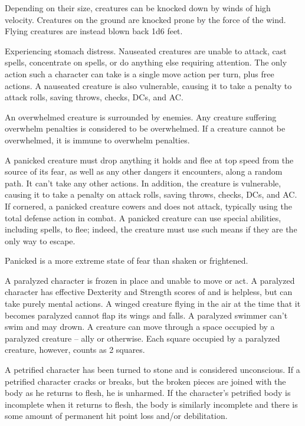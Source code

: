  Depending on their size, creatures can be knocked down by winds of high velocity. Creatures on the ground are knocked prone by the force of the wind. Flying creatures are instead blown back 1d6  feet.

 Experiencing stomach distress. Nauseated creatures are unable to attack, cast spells, concentrate on spells, or do anything else requiring attention. The only action such a character can take is a single move action per turn, plus free actions. A nauseated creature is also vulnerable, causing it to take a  penalty to attack rolls, saving throws, checks, DCs, and AC.

 An overwhelmed creature is surrounded by enemies. Any creature suffering overwhelm penalties is considered to be overwhelmed. If a creature cannot be overwhelmed, it is immune to overwhelm penalties.

 A panicked creature must drop anything it holds and flee at top speed from the source of its fear, as well as any other dangers it encounters, along a random path. It can't take any other actions. In addition, the creature is vulnerable, causing it to take a  penalty on attack rolls, saving throws, checks, DCs, and AC. If cornered, a panicked creature cowers and does not attack, typically using the total defense action in combat. A panicked creature can use special abilities, including spells, to flee; indeed, the creature must use such means if they are the only way to escape.

Panicked is a more extreme state of fear than shaken or frightened.

 A paralyzed character is frozen in place and unable to move or act. A paralyzed character has effective Dexterity and Strength scores of  and is helpless, but can take purely mental actions. A winged creature flying in the air at the time that it becomes paralyzed cannot flap its wings and falls. A paralyzed swimmer can't swim and may drown. A creature can move through a space occupied by a paralyzed creature -- ally or otherwise. Each square occupied by a paralyzed creature, however, counts as 2 squares.

 A petrified character has been turned to stone and is considered unconscious. If a petrified character cracks or breaks, but the broken pieces are joined with the body as he returns to flesh, he is unharmed. If the character's petrified body is incomplete when it returns to flesh, the body is similarly incomplete and there is some amount of permanent hit point loss and/or debilitation.

